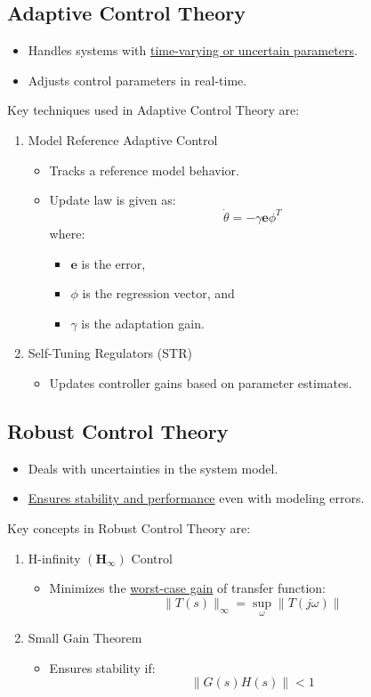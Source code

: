 \documentclass{article}
\begin{document}
\subsection{Adaptive Control Theory}
\begin{itemize}
    \item Handles systems with \underline{time-varying or uncertain parameters}.
    \item Adjusts control parameters in real-time.
\end{itemize}
Key techniques used in Adaptive Control Theory are:
\begin{enumerate}
    \item Model Reference Adaptive Control
        \begin{itemize}
            \item Tracks a reference model behavior.
            \item Update law is given as:
                \[ \dot{\theta} = - \gamma\mathbf{e}\phi^{T} \]
            where:
            \begin{itemize}
                \item $\mathbf{e}$ is the error,
                \item $\phi$ is the regression vector, and
                \item $\gamma$ is the adaptation gain.
            \end{itemize}
        \end{itemize}
    \item Self-Tuning Regulators (STR)
        \begin{itemize}
            \item Updates controller gains based on parameter estimates.
        \end{itemize}
\end{enumerate}

\subsection{Robust Control Theory}
\begin{itemize}
    \item Deals with uncertainties in the system model.
    \item \underline{Ensures stability and performance} even with modeling errors.
\end{itemize}
Key concepts in Robust Control Theory are:
\begin{enumerate}
    \item H-infinity $\mathbf{(H_{\infty})}$ Control
        \begin{itemize}
            \item Minimizes the \underline{worst-case gain} of transfer function:
                \[ \|T(s)\|_{\infty} = \sup_{\omega}\|T(j\omega)\| \]
        \end{itemize}
    \item Small Gain Theorem
        \begin{itemize}
            \item Ensures stability if:
                \[ \|G(s)H(s)\| < 1 \]
        \end{itemize}
\end{enumerate}
\end{document}
